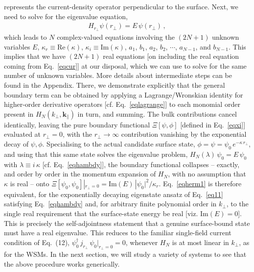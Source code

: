 \documentclass[aps,prb,onecolumn, footinbib, 10pt]{revtex4-2}
\begin{document}
represents the current-density operator perpendicular to the surface. Next, we need to solve for the eigenvalue equation,
\begin{align}
\label{eqhambdy}
H_{r_\perp} \psi (r_\perp) = E\, \psi (r_\perp)\,,
\end{align}
which leads to $N$ complex-valued equations involving the $(2N+1)$ unknown variables $ E$,
$\kappa_r \equiv \text{Re}(\kappa)$, $\kappa_i \equiv \text{Im}(\kappa)$, $a_1$, $ b_1$, $a_2$, $ b_2$, $\cdots$, $a_{N-1}$,
and $b_{N-1}$. This implies that we have $(2N+1)$ real equations [on including the real equation coming from Eq.~\eqref{eqcur}] at our disposal, which we can use to solve for the same number of unknown variables.
More details about intermediate steps can be found in the Appendix. There, we demonstrate explicitly that the general boundary term can be obtained by applying a Lagrange/Wronskian identity for higher-order derivative operators [cf. Eq.~\eqref{eqlagrange}] to each monomial order present in $H_N(k_\perp,\boldsymbol{k}_\parallel)$ in turn, and summing. The bulk contributions cancel identically, leaving the pure boundary functional $\Xi[\psi,\phi]$ [defined in Eq.~\eqref{eqxi}] evaluated at $r_\perp=0$, with the $r_\perp\to\infty$ contribution vanishing by the exponential decay of $\psi,\phi$. Specialising to the actual candidate surface state, $\phi=\psi=\psi_0\,e^{-\kappa \, r_\perp}$, and using that this same state solves the eigenvalue problem, $H_N(\lambda)\,\psi_0=E \, \psi_0$ with $\lambda\equiv i\,\kappa$ [cf. Eq.~\eqref{eqhambdy}], the boundary functional collapses -- exactly, and order by order in the momentum expansion of $H_N$, with no assumption that $\kappa$ is real -- onto $\Xi[\psi_0,\psi_0]|_{r_\perp=0}=\mathrm{Im}(E)\,|\psi_0|^2/\kappa_r$. Eq.~\eqref{eqherm1} is therefore equivalent, for the exponentially
decaying eigenstate ansatz of Eq.~\eqref{eq11} satisfying Eq.~\eqref{eqhambdy} and, for arbitrary finite polynomial order in
$k_\perp$, to the single real requirement that the surface-state energy be real [viz. $\mathrm{Im}(E)=0 $]. This is precisely the self-adjointness statement that a genuine surface-bound state must have a real eigenvalue. This reduces to the familiar single-field current condition of Eq.~(12), $\psi_0^\dagger\, j_{r_\perp}\,\psi_0|_{r_\perp=0}=0$, whenever $H_N$ is at most linear in $k_\perp$, as for the WSMs.
In the next section, we will study a variety of systems to see that the above procedure works generically.
\end{document}
